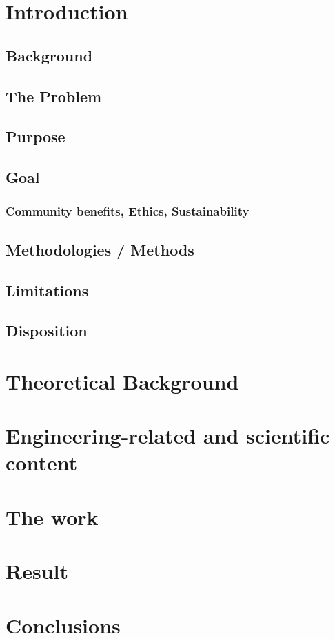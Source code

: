 \documentclass[12pt, a4paper, onecolumn]{article}
\begin{document}
	\tableofcontents
	\newpage
	
	\section{Introduction}
	
		\subsection{Background}
		
		\subsection{The Problem}
		
		\subsection{Purpose}
		
		\subsection{Goal}
		
			\subsubsection{Community benefits, Ethics, Sustainability}
			
		\subsection{Methodologies / Methods}
		
		\subsection{Limitations}
		
		\subsection{Disposition}
		
	\newpage
		
	\section{Theoretical Background}
	\newpage
	
	\section{Engineering-related and scientific content}
	\newpage
	
	\section{The work}
	\newpage
	
	\section{Result}
	\newpage
	
	\section{Conclusions}
	\newpage
		
\end{document}
